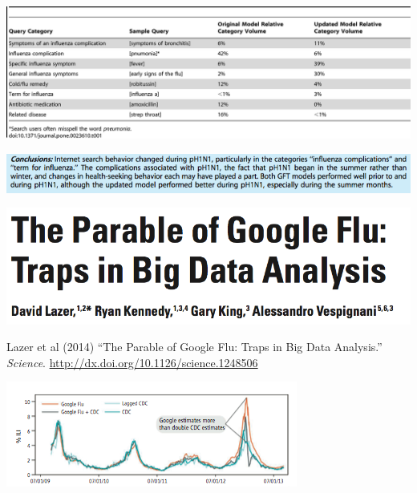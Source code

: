 \documentclass[aspectratio=169]{beamer}
\def\vf{\vfill}
\begin{document}
\begin{frame}

\begin{center}
\includegraphics[width=\textwidth]{figures/cook_assessing_2011_tab1}
\end{center}

\end{frame}
\begin{frame}

\begin{center}
\includegraphics[width=\textwidth]{figures/cook_assessing_2011_conclusion}
\end{center}

\end{frame}
\begin{frame}

\begin{center}
\includegraphics[width=\textwidth]{figures/lazer_parable_2014_title}
\end{center}

\vf 
Lazer et al (2014) ``The Parable of Google Flu: Traps in Big Data Analysis.'' \textit{Science}. \url{http://dx.doi.org/10.1126/science.1248506}

\end{frame}
\begin{frame}

\begin{center}
\includegraphics[width=\textwidth]{figures/lazer_parable_2014_fig1a}
\end{center}

\end{frame}
\end{document}
